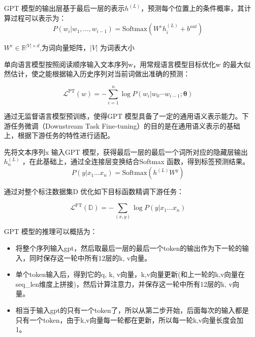 \documentclass{article} %
\begin{document}
GPT 模型的输出层基于最后一层的表示$h^{(L)}$，预测每个位置上的条件概率，其计算过程可以表示为：
$$
{P(w_{i}|w_{1},...,w_{i-1})=\mathrm{Softmax}(W^{e}h_{i}^{(L)}+b^{out})}
$$

$W^{e} \in \mathbb{R}^{|V|\times d}$,为词向量矩阵，$|V|$ 为词表大小

单向语言模型按照阅读顺序输入文本序列w，用常规语言模型目标优化w 的最大似然估计，使之能根据输入历史序列对当前词做出准确的预测：

$$\mathcal{L}^{\mathrm{PT}}(w)=-\sum_{i=1}^{n}\operatorname{log}P(w_{i}|w_{0}\cdots w_{i-1};\boldsymbol{\theta})$$

通过无监督语言模型预训练，使得GPT 模型具备了一定的通用语义表示能力。下游任务微调（Downstream Task Fine-tuning）的目的是在通用语义表示的基础上，根据下游任务的特性进行适配。

先将文本序列x 输入GPT 模型，获得最后一层的最后一个词所对应的隐藏层输出$h^{(L)}_n$ ，在此基础上，通过全连接层变换结合Softmax 函数，得到标签预测结果。
$$P(y|x_{1}...x_{n})=\mathrm{Softmax}({h}^{(L)}{W}^{y})$$

通过对整个标注数据集D 优化如下目标函数精调下游任务：

$$\mathcal{L}^{\mathrm{FT}}(\mathbb{D})=-\sum_{(x,y)}\log P(y|x_{1}...x_{n})$$

GPT 模型的推理可以概括为：
\begin{itemize}
    \item 将整个序列输入gpt，然后取最后一层的最后一个token的输出作为下一轮的输入，同时保存这一轮中所有12层的k, v向量。
    \item 单个token输入后，得到它的q, k, v向量，k,v向量更新(和上一轮的k,v向量在seq\_len维度上拼接)，然后计算注意力，并保存这一轮中所有12层的k, v向量。
    \item 相当于输入gpt的只有一个token了，所以从第二步开始，后面每次的输入都是只有一个token，由于k,v向量每一轮都在更新，所以每一轮k,v向量长度会加1。

\end{itemize}
\end{document}
